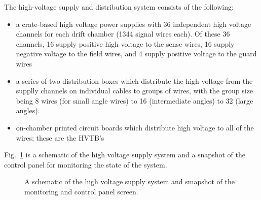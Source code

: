 The high-voltage supply and distribution system consists of the following:
\begin{itemize}
\item a crate-based high voltage power supplies with 36 independent
high voltage channels for each drift chamber (1344 signal wires each).
Of these 36 channels, 16 supply positive high voltage to the sense
wires, 16 supply negative voltage to the field wires, and 4 supply
positive voltage to the guard wires
\item a series of two distribution boxes which distribute the high
voltage from the supplly channels on individual cables to groups
of wires, with the group size being 8 wires (for small angle wires)
to 16 (intermediate angles) to 32 (large angles). 
\item  on-chamber printed circuit boards which distribute high voltage
to all of the wires; these are the HVTB's
\end{itemize}



Fig.~\ref{dc-high-voltage-system} is a schematic of the high voltage
supply system and a snapshot 
of the control panel for monitoring the state of the system.

\begin{figure}
\vspace{4.5cm}
\caption{\small{A schematic of the high voltage supply system and smapshot of 
the monitoring and control panel screen.}}
\label{dc-high-voltage-system}
\end{figure}   


